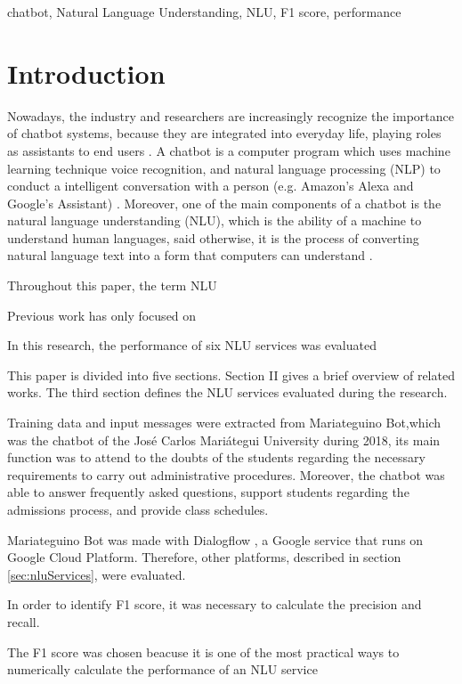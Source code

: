 \documentclass[conference]{IEEEtran}
\begin{document}
\begin{IEEEkeywords}
    chatbot, Natural Language Understanding, NLU, F1 score, performance
\end{IEEEkeywords}

\section{Introduction}
Nowadays, the industry and researchers are increasingly recognize the importance of chatbot systems, because they are integrated into everyday life, playing roles as assistants to end users \cite{Bird2018}. A chatbot is a computer program which uses machine learning technique voice recognition, and natural language processing (NLP) to conduct a intelligent conversation with a person (e.g. Amazon's Alexa and Google's Assistant) \cite{mittal2019getting}. Moreover, one of the main components of a chatbot is the natural language understanding (NLU), which is the ability of a machine to understand human languages, said otherwise, it is the process of converting natural language text into a form that computers can understand \cite{pathak2017artificial}.

Throughout this paper, the term NLU

Previous work has only focused on

In this research, the performance of six NLU services was evaluated

This paper is divided into five sections. Section II gives a brief overview of related works. The third section defines the NLU services evaluated during the research.

Training data and input messages were extracted from Mariateguino Bot,which was the chatbot of the José Carlos Mariátegui University during 2018, its main function was to attend to the doubts of the students regarding the necessary requirements to carry out administrative procedures. Moreover, the chatbot was able to answer frequently asked questions, support students regarding the admissions process, and provide class schedules.

Mariateguino Bot was made with Dialogflow \cite{dialogflow2020}, a Google service that runs on Google Cloud Platform. Therefore, other platforms, described in section \ref{sec:nluServices}, were evaluated.

In order to identify F1 score, it was necessary to calculate the precision and recall.

The F1 score was chosen beacuse it is one of the most practical ways to numerically calculate the performance of an NLU service
\end{document}
